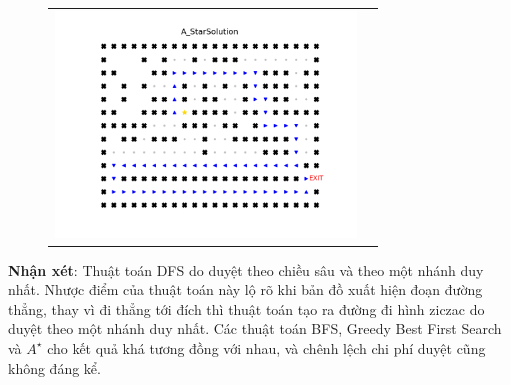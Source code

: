 \documentclass[11pt]{article} %
\begin{document}
\begin{itemize}
\begin{figure}[h]
\begin{tabular}{cc}
			\includegraphics[width=8cm]{Figures/fg4_astar.png}
		\end{tabular}
	\end{figure}
	
	\textbf{Nhận xét}: Thuật toán DFS do duyệt theo chiều sâu và theo một nhánh duy nhất. Nhược điểm của thuật toán này lộ rõ khi bản đồ xuất hiện đoạn đường thẳng, thay vì đi thẳng tới đích thì thuật toán tạo ra đường đi hình ziczac do duyệt theo một nhánh duy nhất. Các thuật toán BFS, Greedy Best First Search và $A^{\star}$ cho kết quả khá tương đồng với nhau, và chênh lệch chi phí duyệt cũng không đáng kể.
	


\end{itemize}
\end{document}
